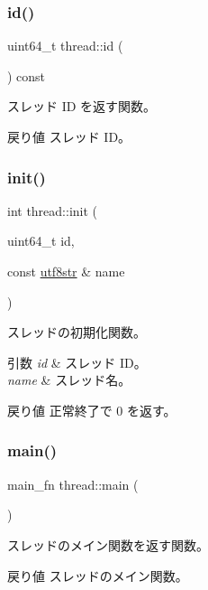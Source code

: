 \subsubsection{\texorpdfstring{id()}{id()}\hspace{0.1cm}{\footnotesize\ttfamily [2/2]}}
{\footnotesize\ttfamily uint64\+\_\+t thread\+::id (\begin{DoxyParamCaption}{ }\end{DoxyParamCaption}) const}

スレッド ID を返す関数。 \begin{DoxyReturn}{戻り値}
スレッド I\+D。 
\end{DoxyReturn}
\hypertarget{classthread_a615945e7f24c83b235a8f4ac166ad70e}{}\label{classthread_a615945e7f24c83b235a8f4ac166ad70e} 
\subsubsection{\texorpdfstring{init()}{init()}}
{\footnotesize\ttfamily int thread\+::init (\begin{DoxyParamCaption}\item[{uint64\+\_\+t}]{id,  }\item[{const \hyperlink{classutf8str}{utf8str} \&}]{name }\end{DoxyParamCaption})}

スレッドの初期化関数。 
\begin{DoxyParams}{引数}
{\em id} & スレッド I\+D。 \\
\hline
{\em name} & スレッド名。 \\
\hline
\end{DoxyParams}
\begin{DoxyReturn}{戻り値}
正常終了で 0 を返す。 
\end{DoxyReturn}
\hypertarget{classthread_aa4a8c5526714238ea8890badce737c08}{}\label{classthread_aa4a8c5526714238ea8890badce737c08} 
\subsubsection{\texorpdfstring{main()}{main()}}
{\footnotesize\ttfamily main\+\_\+fn thread\+::main (\begin{DoxyParamCaption}{ }\end{DoxyParamCaption})}

スレッドのメイン関数を返す関数。 \begin{DoxyReturn}{戻り値}
スレッドのメイン関数。 
\end{DoxyReturn}
\hypertarget{classthread_a1edac2ded94641cdef9dacb04efb5c85}{}\label{classthread_a1edac2ded94641cdef9dacb04efb5c85} 
